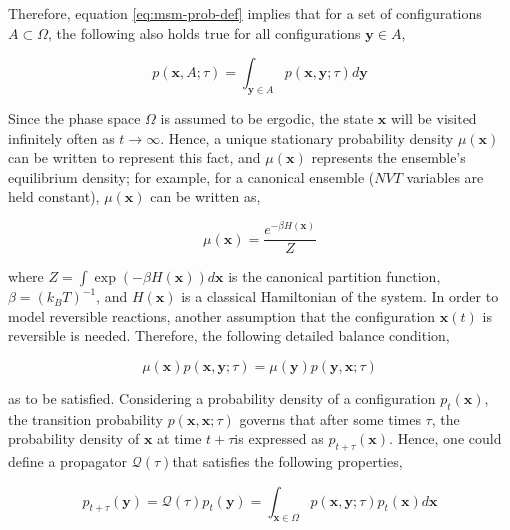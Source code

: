 \begin{spacing}{2.0}
    Therefore, equation \ref{eq:msm-prob-def} implies that for a set of configurations $A \subset \Omega$, the following also holds true for all
    configurations $\mathbf{y} \in A$,

    \begin{equation}
        p(\mathbf{x},A;\tau) = \int_{\mathbf{y}\in A}p(\mathbf{x},\mathbf{y};\tau)d\mathbf{y}
    \end{equation}

    Since the phase space $\Omega$ is assumed to be ergodic, the state $\mathbf{x}$ will be visited infinitely often as $t\to\infty$. Hence, a
    unique stationary probability density $\mu(\mathbf{x})$ can be written to represent this fact, and $\mu(\mathbf{x})$ represents the ensemble's
    equilibrium density; for example, for a canonical ensemble ($NVT$ variables are held constant), $\mu(\mathbf{x})$ can be written as,

    \begin{equation}
        \mu(\mathbf{x}) = \frac{e^{-\beta H(\mathbf{x})}}{Z}
    \end{equation}

    \noindent where $Z = \int\exp(-\beta H(\mathbf{x}))d\mathbf{x}$ is the canonical partition function, $\beta = (k_B T)^{-1}$, and $H(\mathbf{x})$
    is a classical Hamiltonian of the system. In order to model reversible reactions, another assumption that the configuration $\mathbf{x}(t)$ 
    is reversible is needed. Therefore, the following detailed balance condition,

    \begin{equation}
        \mu(\mathbf{x})p(\mathbf{x},\mathbf{y};\tau) = \mu(\mathbf{y})p(\mathbf{y},\mathbf{x};\tau)
    \end{equation}

    \noindent as to be satisfied. Considering a probability density of a configuration $p_t(\mathbf{x})$, the transition probability 
    $p(\mathbf{x},\mathbf{x};\tau)$ governs that after some times $\tau$, the probability density of $\mathbf{x}$ at time $t + \tau$is expressed as
    $p_{t+\tau}(\mathbf{x})$. Hence, one could define a propagator $\mathcal{Q}(\tau)$that satisfies the following properties,

    \begin{equation}
        p_{t+\tau}(\mathbf{y}) = \mathcal{Q}(\tau)p_t(\mathbf{y}) = \int_{\mathbf{x}\in\Omega}p(\mathbf{x},\mathbf{y};\tau)p_t(\mathbf{x})d\mathbf{x}
        \label{eq:msm-propagator}
    \end{equation}


\end{spacing}
